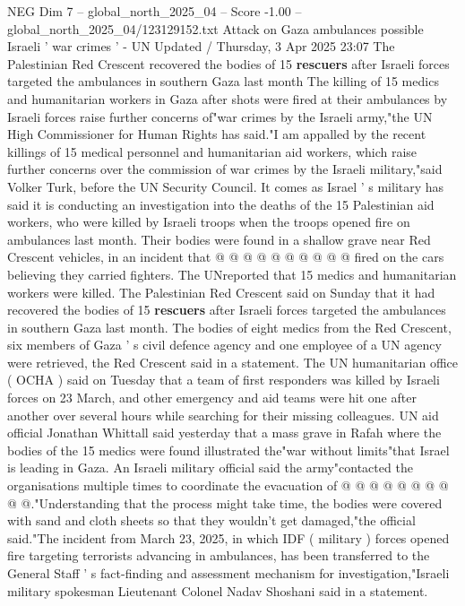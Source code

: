 \begin{textsample}{NEG Dim 7 – global\_north\_2025\_04 – Score -1.00 – global\_north\_2025\_04/123129152.txt}  \label{ex:f7_neg_099}
Attack on Gaza ambulances possible Israeli ' war crimes ' - UN Updated / Thursday, 3 Apr 2025 23:07 The Palestinian Red Crescent recovered the bodies of 15 \textbf{rescuers} after Israeli forces targeted the ambulances in southern Gaza last month The killing of 15 medics and humanitarian workers in Gaza after shots were fired at their ambulances by Israeli forces raise further concerns of"war crimes by the Israeli army,"the UN High Commissioner for Human Rights has said."I am appalled by the recent killings of 15 medical personnel and humanitarian aid workers, which raise further concerns over the commission of war crimes by the Israeli military,"said Volker Turk, before the UN Security Council.
It comes as Israel ' s military has said it is conducting an investigation into the deaths of the 15 Palestinian aid workers, who were killed by Israeli troops when the troops opened fire on ambulances last month.
Their bodies were found in a shallow grave near Red Crescent vehicles, in an incident that @ @ @ @ @ @ @ @ @ @ fired on the cars believing they carried fighters.
The UNreported that 15 medics and humanitarian workers were killed.
The Palestinian Red Crescent said on Sunday that it had recovered the bodies of 15 \textbf{rescuers} after Israeli forces targeted the ambulances in southern Gaza last month.
The bodies of eight medics from the Red Crescent, six members of Gaza ' s civil defence agency and one employee of a UN agency were retrieved, the Red Crescent said in a statement.
The UN humanitarian office ( OCHA ) said on Tuesday that a team of first responders was killed by Israeli forces on 23 March, and other emergency and aid teams were hit one after another over several hours while searching for their missing colleagues.
UN aid official Jonathan Whittall said yesterday that a mass grave in Rafah where the bodies of the 15 medics were found illustrated the"war without limits"that Israel is leading in Gaza.
An Israeli military official said the army"contacted the organisations multiple times to coordinate the evacuation of @ @ @ @ @ @ @ @ @ @."Understanding that the process might take time, the bodies were covered with sand and cloth sheets so that they wouldn't get damaged,"the official said."The incident from March 23, 2025, in which IDF ( military ) forces opened fire targeting terrorists advancing in ambulances, has been transferred to the General Staff ' s fact-finding and assessment mechanism for investigation,"Israeli military spokesman Lieutenant Colonel Nadav Shoshani said in a statement.

\end{textsample}
